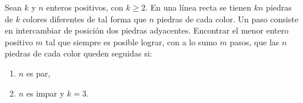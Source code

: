 Sean $k$ y $n$ enteros positivos, con $k \geq 2$. En una línea recta se tienen $kn$ piedras de $k$ colores diferentes de tal forma que $n$ piedras de cada color. Un paso consiste en intercambiar de posición dos piedras adyacentes. Encontrar el menor entero positivo $m$ tal que siempre es posible lograr, con a lo sumo $m$ pasos, que las $n$ piedras de cada color queden seguidas si:
 \begin{enumerate} 
   \item $n$ es par,
   \item $n$ es impar y $k=3$.
 \end{enumerate} 
